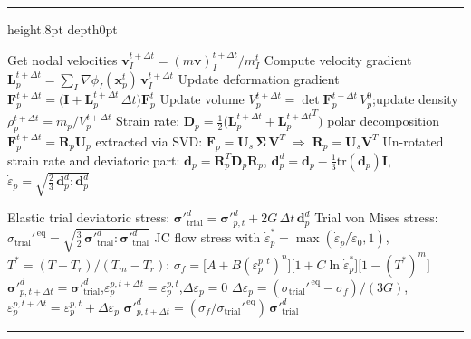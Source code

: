 \documentclass[12pt,a4paper]{report}
\makeatletter
\newenvironment{breakablealgorithm}
  {%
   \begin{center}
     \refstepcounter{algorithm}%
     \hrule height.8pt depth0pt \kern2pt%
     \renewcommand{\caption}[2][\relax]{%
       {\raggedright\textbf{\ALG@name~\thealgorithm} ##2\par}%
       \ifx\relax##1\relax
         \addcontentsline{loa}{algorithm}{\protect\numberline{\thealgorithm}##2}%
       \else
         \addcontentsline{loa}{algorithm}{\protect\numberline{\thealgorithm}##1}%
       \fi
       \kern2pt\hrule\kern2pt
     }
  }
  {%
     \kern2pt\hrule\relax%
   \end{center}
  }
\makeatother
\begin{document}
\begin{breakablealgorithm}
\begin{algorithmic}[1]
			\State Get nodal velocities $\mathbf{v}_I^{t+\Delta t} = (m\mathbf{v})_I^{t+\Delta t}/m_I^t$
			\State Compute velocity gradient $\mathbf{L}_p^{t+\Delta t} = \sum_I \nabla\phi_I(\mathbf{x}_p^t)\,\mathbf{v}_I^{t+\Delta t}$
			\State Update deformation gradient $\mathbf{F}_p^{t+\Delta t} = \bigl(\mathbf{I} + \mathbf{L}_p^{t+\Delta t}\,\Delta t\bigr)\mathbf{F}_p^t$
			\State Update volume $V_p^{t+\Delta t} = \det\mathbf{F}_p^{t+\Delta t}\,V_p^0$;\quad update density $\rho_p^{t+\Delta t} = m_p/V_p^{t+\Delta t}$
			\State Strain rate: $\mathbf{D}_p = \tfrac{1}{2}\bigl(\mathbf{L}_p^{t+\Delta t} + {\mathbf{L}_p^{t+\Delta t}}^T\bigr)$
			\State polar decomposition $\mathbf{F}_p^{t+\Delta t} = \mathbf{R}_p\mathbf{U}_p$ extracted via SVD:
			\Statex \hspace{4.5em}  $\mathbf{F}_p = \mathbf{U}_s\,\boldsymbol{\Sigma}\,\mathbf{V}^T \;\Rightarrow\; \mathbf{R}_p = \mathbf{U}_s\mathbf{V}^T$
			\State Un-rotated strain rate and deviatoric part: 
			\Statex \hspace{4.5em} $\mathbf{d}_p = \mathbf{R}_p^T\mathbf{D}_p\mathbf{R}_p$,\; $\mathbf{d}_p^d = \mathbf{d}_p - \tfrac{1}{3}\mathrm{tr}(\mathbf{d}_p)\mathbf{I}$,\; $\dot{\varepsilon}_p = \sqrt{\tfrac{2}{3}\,\mathbf{d}_p^d:\mathbf{d}_p^d}$

				\State Elastic trial deviatoric stress: ${\boldsymbol{\sigma}'}_{\mathrm{trial}}^{d} = {\boldsymbol{\sigma}'}_{p,t}^{d} + 2G\,\Delta t\,\mathbf{d}_p^d$
				\State Trial von Mises stress: $\sigma_{\mathrm{trial}}'^{\,\mathrm{eq}} = \sqrt{\tfrac{3}{2}\,{\boldsymbol{\sigma}'}_{\mathrm{trial}}^{d}:{\boldsymbol{\sigma}'}_{\mathrm{trial}}^{d}}$
				\State JC flow stress with $\dot{\varepsilon}_p^* = \max(\dot{\varepsilon}_p/\dot{\varepsilon}_0,1)$, $T^* = (T-T_r)/(T_m-T_r)$:
					$\sigma_f = \bigl[A+B(\varepsilon_p^{p,t})^n\bigr]\bigl[1+C\ln\dot{\varepsilon}_p^*\bigr]\bigl[1-(T^*)^m\bigr]$
				 
					\State ${\boldsymbol{\sigma}'}_{p,t+\Delta t}^{d} = {\boldsymbol{\sigma}'}_{\mathrm{trial}}^{d}$,\quad $\varepsilon_p^{p,t+\Delta t} = \varepsilon_p^{p,t}$,\quad $\Delta\varepsilon_p = 0$
				\Else {}
					\State $\Delta\varepsilon_p = (\sigma_{\mathrm{trial}}'^{\,\mathrm{eq}} - \sigma_f)/(3G)$,\quad $\varepsilon_p^{p,t+\Delta t} = \varepsilon_p^{p,t} + \Delta\varepsilon_p$
					\State ${\boldsymbol{\sigma}'}_{p,t+\Delta t}^{d} = (\sigma_f/\sigma_{\mathrm{trial}}'^{\,\mathrm{eq}})\,{\boldsymbol{\sigma}'}_{\mathrm{trial}}^{d}$
				\EndIf
			\EndPhase


\end{algorithmic}
\end{breakablealgorithm}
\end{document}
